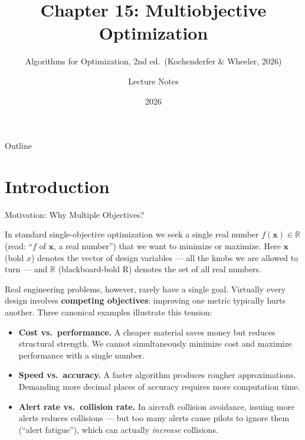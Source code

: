 \documentclass[aspectratio=169,10pt]{beamer}
\title[Chapter 15]{Chapter 15: Multiobjective Optimization}
\subtitle{Algorithms for Optimization, 2nd ed.\ (Kochenderfer \& Wheeler, 2026)}
\author{Lecture Notes}
\date{2026}
\newcommand{\bx}{\mathbf{x}}
\begin{document}
\begin{frame}
  \titlepage
\end{frame}

\begin{frame}{Outline}
  \tableofcontents
\end{frame}

\section{Introduction}

\begin{frame}[allowframebreaks]{Motivation: Why Multiple Objectives?}

In standard single-objective optimization we seek a single real number
$f(\bx) \in \mathbb{R}$ (read: ``$f$ of $\mathbf{x}$, a real number'') that we
want to minimize or maximize.  Here $\bx$ (bold $x$) denotes the vector of
design variables --- all the knobs we are allowed to turn --- and $\mathbb{R}$
(blackboard-bold R) denotes the set of all real numbers.

Real engineering problems, however, rarely have a single goal.  Virtually every
design involves \textbf{competing objectives}: improving one metric typically
hurts another.  Three canonical examples illustrate this tension:

\begin{itemize}
  \item \textbf{Cost vs.\ performance.}  A cheaper material saves money but
    reduces structural strength.  We cannot simultaneously minimize cost and
    maximize performance with a single number.

  \item \textbf{Speed vs.\ accuracy.}  A faster algorithm produces rougher
    approximations.  Demanding more decimal places of accuracy requires more
    computation time.

  \item \textbf{Alert rate vs.\ collision rate.}  In aircraft collision
    avoidance, issuing more alerts reduces collisions --- but too many alerts
    cause pilots to ignore them (``alert fatigue''), which can actually
    \emph{increase} collisions.
\end{itemize}


\end{frame}
\end{document}
